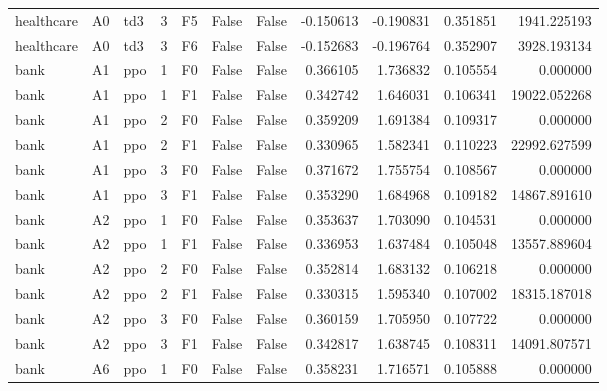 \begin{tabular}{lllrlllrrrr}
healthcare &      A0 &       td3 &     3 &  F5 &           False &            False & -0.150613 & -0.190831 & 0.351851 &      1941.225193 \\
healthcare &      A0 &       td3 &     3 &  F6 &           False &            False & -0.152683 & -0.196764 & 0.352907 &      3928.193134 \\
      bank &      A1 &       ppo &     1 &  F0 &           False &            False &  0.366105 &  1.736832 & 0.105554 &         0.000000 \\
      bank &      A1 &       ppo &     1 &  F1 &           False &            False &  0.342742 &  1.646031 & 0.106341 &     19022.052268 \\
      bank &      A1 &       ppo &     2 &  F0 &           False &            False &  0.359209 &  1.691384 & 0.109317 &         0.000000 \\
      bank &      A1 &       ppo &     2 &  F1 &           False &            False &  0.330965 &  1.582341 & 0.110223 &     22992.627599 \\
      bank &      A1 &       ppo &     3 &  F0 &           False &            False &  0.371672 &  1.755754 & 0.108567 &         0.000000 \\
      bank &      A1 &       ppo &     3 &  F1 &           False &            False &  0.353290 &  1.684968 & 0.109182 &     14867.891610 \\
      bank &      A2 &       ppo &     1 &  F0 &           False &            False &  0.353637 &  1.703090 & 0.104531 &         0.000000 \\
      bank &      A2 &       ppo &     1 &  F1 &           False &            False &  0.336953 &  1.637484 & 0.105048 &     13557.889604 \\
      bank &      A2 &       ppo &     2 &  F0 &           False &            False &  0.352814 &  1.683132 & 0.106218 &         0.000000 \\
      bank &      A2 &       ppo &     2 &  F1 &           False &            False &  0.330315 &  1.595340 & 0.107002 &     18315.187018 \\
      bank &      A2 &       ppo &     3 &  F0 &           False &            False &  0.360159 &  1.705950 & 0.107722 &         0.000000 \\
      bank &      A2 &       ppo &     3 &  F1 &           False &            False &  0.342817 &  1.638745 & 0.108311 &     14091.807571 \\
      bank &      A6 &       ppo &     1 &  F0 &           False &            False &  0.358231 &  1.716571 & 0.105888 &         0.000000 \\

\end{tabular}
